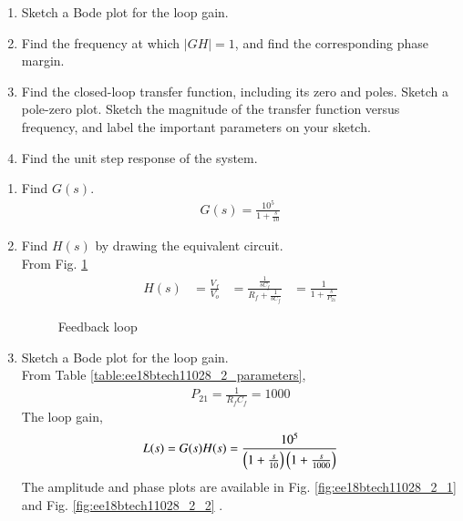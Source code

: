\begin{enumerate}[label=(\alph*)]
\item Sketch a Bode plot for the loop gain.
\item  Find the frequency at which $ |GH|= 1$, and find the corresponding phase margin.
\item Find the closed-loop transfer function, including its zero
and poles. Sketch a pole-zero plot. Sketch the magnitude of
the transfer function versus frequency, and label the important parameters on your sketch.
\item  Find the unit step response of the system.
\end{enumerate}
\begin{enumerate}[label=\arabic*.,ref=\theenumi]
\item Find $G(s)$.
\\
\solution 
\begin{align}
    G(s) = \frac{10^5}{1 + \frac{s}{10}}
        \label{eq:ee18btech11028_2_2}
\end{align}


%
\item Find $H(s)$ by drawing the equivalent circuit.
\\
\solution From Fig. \ref{fig:ee18btech11028_2_h}
%
\begin{align}
    H(s) &= \frac{V_{f}}{V_{o}}
    &= \frac{\frac{1}{sC_{f}}}{R_{f} + \frac{1}{sC_{f}}}
    &= \frac{1}{1 + \frac{s}{P_{21}}}
        \label{eq:ee18btech11028_2_1}
\end{align}
\begin{figure}[!ht]
	\begin{center}
		\resizebox{\columnwidth/2}{!}{}
		
	\end{center}
\caption{Feedback loop}
\label{fig:ee18btech11028_2_h}
\end{figure}
\item Sketch a Bode plot for the loop gain.
\\
\solution
From Table \ref{table:ee18btech11028_2_parameters},
\begin{align}
    P_{21} = \frac{1}{R_{f}C_{f}} = 1000
\end{align}
The loop gain, 
\begin{align}
L(s) =  G(s)H(s) = \frac{10^5}{\left(1+\frac{s}{10}\right)\left(1 + \frac{s}{1000}\right)}
\end{align}
The amplitude and phase plots are available in Fig. \ref{fig:ee18btech11028_2_1} and Fig. \ref{fig:ee18btech11028_2_2} .


\end{enumerate}
